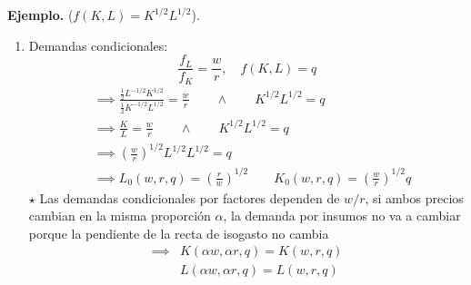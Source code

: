 \documentclass{report}
\renewcommand{\a}{\alpha}
\newenvironment{example}[1]{\noindent\setlength{\parskip}{0pt}\textbf{Ejemplo.} (#1).}{}
\newenvironment{obs}{$\star$ }{}
\begin{document}
\begin{example}
    {$f\!\left( K,L \right) = K^{1/2} L^{1/2}$}
    \begin{enumerate}
        \item Demandas condicionales:
            \[
                \frac{f_L}{f_K} = \frac{w}{r} , \quad f\!\left( K,L \right) = q
            \] 
            \begin{align*}
                &\implies \frac{\frac{1}{2}L^{-1/2}K^{1/2}}{\frac{1}{2}K^{-1/2}L^{1/2}} = \frac{w}{r}\qquad \land \qquad K^{1/2}L^{1/2} = q\\
                &\implies \frac{K}{L} = \frac{w}{r}\qquad \land\qquad K^{1/2}L^{1/2} = q \\
                &\implies \left( \frac{w}{r} \right) ^{1/2} L^{1/2}L^{1/2} = q \\
                &\implies L_0\!\left( w,r,q \right) = \left( \frac{r}{w} \right) ^{1/2} \qquad K_0\!\left( w,r,q \right) = \left( \frac{w}{r} \right) ^{1/2} q
            \end{align*}
            \begin{obs}
                Las demandas condicionales por factores dependen de  $w/r$, si ambos precios cambian en la misma proporción $\alpha$, la demanda por insumos no va a cambiar porque la pendiente de la recta de isogasto no cambia
                \begin{align*}
                    \implies & K\!\left( \alpha w, \alpha r, q \right) = K\!\left( w,r,q \right) \\
                             & L\!\left( \a w, \a r, q \right) = L\!\left( w,r,q \right) 
                \end{align*}


\end{obs}
\end{enumerate}
\end{example}
\end{document}
